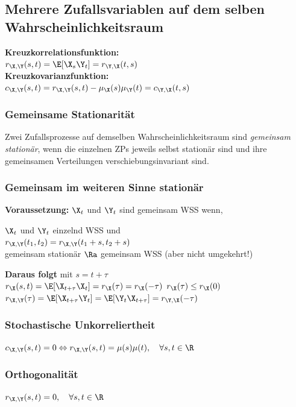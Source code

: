 \documentclass[german,color,6pt]{latex4ei/latex4ei_sheet}
\begin{document}
\begin{sectionbox}
	\subsection{Mehrere Zufallsvariablen auf dem selben Wahrscheinlichkeitsraum}
	\begin{emphbox}
		\raggedright
		\textbf{Kreuzkorrelationsfunktion:} \\ $r_{\X,\Y}(s,t) = \E[\X_s \Y_t] = r_{\Y,\X}(t,s)$\\
		\textbf{Kreuzkovarianzfunktion:}\\ $c_{\X,\Y}(s,t) = r_{\X,\Y}(s,t) - \mu_{\X}(s)\mu_{\Y}(t) = c_{\Y,\X}(t,s)$
	\end{emphbox}

	\subsubsection{Gemeinsame Stationarität}
	Zwei Zufallsprozesse auf demselben Wahrscheinlichkeitsraum sind \emph{gemeinsam stationär}, wenn die einzelnen ZPs jeweils selbst stationär sind und ihre gemeinsamen Verteilungen verschiebungsinvariant sind.

	\subsubsection{Gemeinsam im weiteren Sinne stationär}
	\textbf{Voraussetzung:} $\X_t$ und $\Y_t$ sind gemeinsam WSS wenn,\\

	\begin{emphbox}
		\raggedright
		$\X_t$ und $\Y_t$ einzelnd WSS und\\
		$r_{\X,\Y}(t_1,t_2) = r_{\X,\Y}(t_1 + s,t_2 + s)$\\
		gemeinsam stationär $\Ra$ gemeinsam WSS (aber nicht umgekehrt!)
	\end{emphbox}
	\textbf{Daraus folgt} mit $s = t + \tau$\\
	$r_{\X}(s,t) = \E[\X_{t+\tau} \X_t] = r_{\X}(\tau) = r_{\X}(-\tau)$ \qquad $r_{\X}(\tau) \le r_{\X}(0)$\\
	$r_{\X,\Y}(\tau)=\E[\X_{t+\tau} \Y_t]=\E[\Y_t \X_{t+\tau}]=r_{\Y,\X}(-\tau)$
	\subsubsection{Stochastische Unkorreliertheit}
	$c_{\X,\Y}(s,t) = 0 \Leftrightarrow r_{\X,\Y}(s,t) = \mu(s)\mu(t), \quad \forall s,t \in \R$
	\subsubsection{Orthogonalität}
	$r_{\X,\Y}(s,t) = 0, \quad \forall s,t \in \R$
\end{sectionbox}
\end{document}
